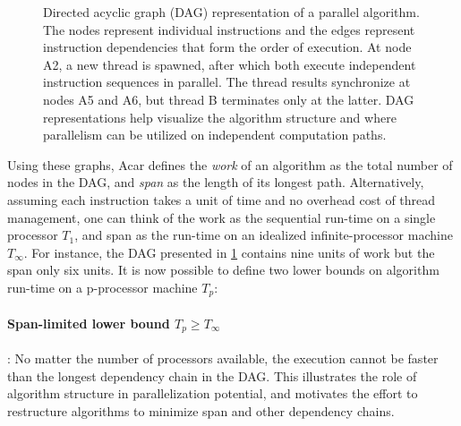 \documentclass[english,12pt,a4paper,pdftex,sci,utf8]{aaltothesis}
\begin{document}
\begin{figure}[h]
\centering
{}
\caption{Directed acyclic graph (DAG) representation of a parallel algorithm. The nodes represent individual instructions and the edges represent instruction dependencies that form the order of execution. At node A2, a new thread is spawned, after which both execute independent instruction sequences in parallel. The thread results synchronize at nodes A5 and A6, but thread B terminates only at the latter. DAG representations help visualize the algorithm structure and where parallelism can be utilized on independent computation paths.}
\label{fig:DAG-algo}
\end{figure}

Using these graphs, Acar \cite{acar2016parallel} defines the \emph{work} of an algorithm as the total number of nodes in the DAG, and \emph{span} as the length of its longest path. Alternatively, assuming each instruction takes a unit of time and no overhead cost of thread management, one can think of the work as the sequential run-time on a single processor $T_1$, and span as the run-time on an idealized infinite-processor machine $T_{\infty}$. For instance, the DAG presented in \cref{fig:DAG-algo} contains nine units of work but the span only six units. It is now possible to define two lower bounds on algorithm run-time on a p-processor machine $T_p$:

\paragraph{Span-limited lower bound $T_p \geq T_\infty$}: No matter the number of processors available, the execution cannot be faster than the longest dependency chain in the DAG. This illustrates the role of algorithm structure in parallelization potential, and motivates the effort to restructure algorithms to minimize span and other dependency chains.
\end{document}
